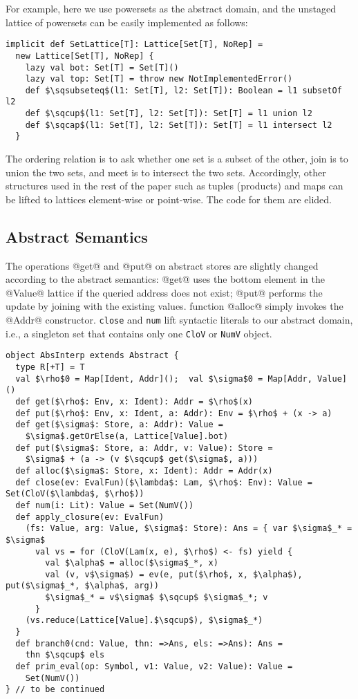 For example, here we use powersets as the abstract domain, and the unstaged lattice 
of powersets can be easily implemented as follows:

\begin{lstlisting}
implicit def SetLattice[T]: Lattice[Set[T], NoRep] = 
  new Lattice[Set[T], NoRep] {
    lazy val bot: Set[T] = Set[T]()
    lazy val top: Set[T] = throw new NotImplementedError()
    def $\sqsubseteq$(l1: Set[T], l2: Set[T]): Boolean = l1 subsetOf l2
    def $\sqcup$(l1: Set[T], l2: Set[T]): Set[T] = l1 union l2
    def $\sqcap$(l1: Set[T], l2: Set[T]): Set[T] = l1 intersect l2
  }
\end{lstlisting}

The ordering relation is to ask whether one set is a subset of the other, 
join is to union the two sets, and meet is to intersect the two sets.
Accordingly, other structures used in the rest of the paper such as tuples 
(products) and maps can be lifted to lattices element-wise or point-wise.
The code for them are elided.

\subsection{Abstract Semantics}
The operations @get@ and @put@ on abstract stores are slightly changed according to
the abstract semantics: @get@ uses the bottom element in the @Value@ lattice if the 
queried address does not exist; @put@ performs the update by joining with the existing values.
function @alloc@ simply invokes the @Addr@ constructor.
\texttt{close} and \texttt{num} lift syntactic literals to our abstract domain, i.e., 
a singleton set that contains only one \texttt{CloV} or \texttt{NumV} object.

\begin{lstlisting}
object AbsInterp extends Abstract {
  type R[+T] = T
  val $\rho$0 = Map[Ident, Addr]();  val $\sigma$0 = Map[Addr, Value]()
  def get($\rho$: Env, x: Ident): Addr = $\rho$(x)
  def put($\rho$: Env, x: Ident, a: Addr): Env = $\rho$ + (x -> a)
  def get($\sigma$: Store, a: Addr): Value = 
    $\sigma$.getOrElse(a, Lattice[Value].bot)
  def put($\sigma$: Store, a: Addr, v: Value): Store =
    $\sigma$ + (a -> (v $\sqcup$ get($\sigma$, a)))
  def alloc($\sigma$: Store, x: Ident): Addr = Addr(x)
  def close(ev: EvalFun)($\lambda$: Lam, $\rho$: Env): Value = Set(CloV($\lambda$, $\rho$))
  def num(i: Lit): Value = Set(NumV())
  def apply_closure(ev: EvalFun)
    (fs: Value, arg: Value, $\sigma$: Store): Ans = { var $\sigma$_* = $\sigma$
      val vs = for (CloV(Lam(x, e), $\rho$) <- fs) yield {
        val $\alpha$ = alloc($\sigma$_*, x)
        val (v, v$\sigma$) = ev(e, put($\rho$, x, $\alpha$), put($\sigma$_*, $\alpha$, arg))
        $\sigma$_* = v$\sigma$ $\sqcup$ $\sigma$_*; v
      }
    (vs.reduce(Lattice[Value].$\sqcup$), $\sigma$_*)
  }
  def branch0(cnd: Value, thn: =>Ans, els: =>Ans): Ans = 
    thn $\sqcup$ els
  def prim_eval(op: Symbol, v1: Value, v2: Value): Value = 
    Set(NumV())
} // to be continued
\end{lstlisting}

